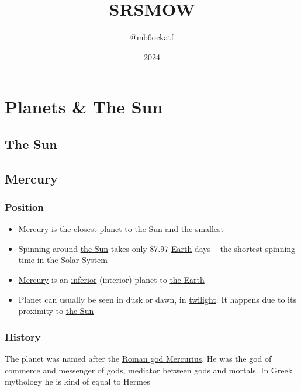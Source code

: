 
\title{SRSMOW}
\author{@mb6ockatf}
\date{2024}
\graphicspath{{./static/photos/}}

\maketitle
\tableofcontents
\section{Planets \& The Sun}
\subsection{The Sun}
\label{star:sun}

\subsection{Mercury}
\label{planet:mercury}
\begin{figure}
	
\end{figure}
\subsubsection{Position}
\begin{itemize}
	\item \hyperref[planet:mercury]{Mercury} is the closest planet to
		\hyperref[star:sun]{the Sun} and the smallest
	\item Spinning around \hyperref[star:sun]{the Sun} takes only 87.97
		\hyperref[planet:earth]{Earth} days -- the shortest spinning
		time in the Solar System
	\item \hyperref[planet:mercury]{Mercury} is an
		\href{https://en.m.wikipedia.org/wiki/Inferior_and_superior_planets}{inferior}
		(interior) planet to \hyperref[planet:earth]{the Earth}
	\item Planet can usually be seen in dusk or dawn, in
		\href{https://en.wikipedia.org/wiki/Twilight}{twilight}. It
		happens due to its proximity to \hyperref[star:sun]{the Sun}
\end{itemize}
\subsubsection{History}
The planet was named after the
\href{https://en.wikipedia.org/wiki/Mercury_(mythology)}{Roman god Mercurius}.
He was the god of commerce and messenger of gods, mediator between gods and
mortals. In Greek mythology he is kind of equal to Hermes
